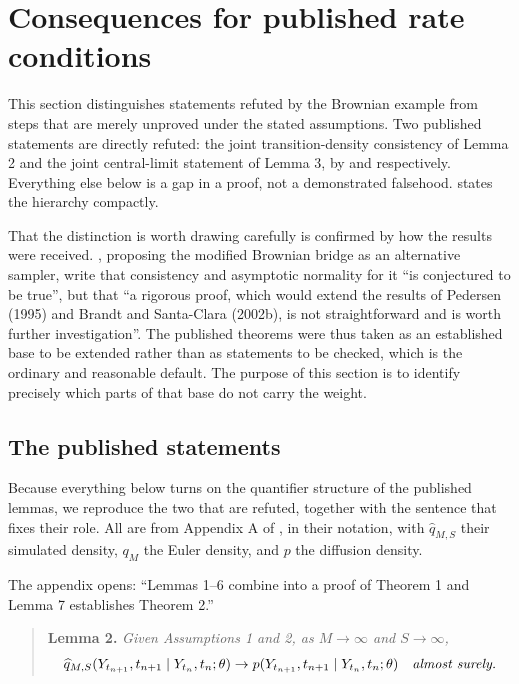 \documentclass[11pt]{article}
\theoremstyle{definition}
\begin{document}
\FloatBarrier
\section{Consequences for published rate conditions}\label{sec:proof_review}

This section distinguishes statements refuted by the Brownian example from steps that are merely unproved under the stated assumptions. Two published statements are directly refuted: the joint transition-density consistency of Lemma 2 and the joint central-limit statement of Lemma 3, by  and  respectively. Everything else below is a gap in a proof, not a demonstrated falsehood.  states the hierarchy compactly.

That the distinction is worth drawing carefully is confirmed by how the results were received. \citet{StramerYan2007b}, proposing the modified Brownian bridge as an alternative sampler, write that consistency and asymptotic normality for it ``is conjectured to be true'', but that ``a rigorous proof, which would extend the results of Pedersen (1995) and Brandt and Santa-Clara (2002b), is not straightforward and is worth further investigation''. The published theorems were thus taken as an established base to be extended rather than as statements to be checked, which is the ordinary and reasonable default. The purpose of this section is to identify precisely which parts of that base do not carry the weight.

\subsection{The published statements}\label{sec:published_statements}

Because everything below turns on the quantifier structure of the published lemmas, we reproduce the two that are refuted, together with the sentence that fixes their role. All are from Appendix A of \citet[pp.~202--203]{BrandtSantaClara2002}, in their notation, with $\widehat q_{M,S}$ their simulated density, $q_M$ the Euler density, and $p$ the diffusion density.

The appendix opens: ``Lemmas 1--6 combine into a proof of Theorem 1 and Lemma 7 establishes Theorem 2.''

\begin{quote}
\textbf{Lemma 2.} \emph{Given Assumptions 1 and 2, as $M\to\infty$ and $S\to\infty$,}
\[
\widehat q_{M,S}(Y_{t_{n+1}},t_{n+1}\mid Y_{t_n},t_n;\theta)\to p(Y_{t_{n+1}},t_{n+1}\mid Y_{t_n},t_n;\theta)
\quad\text{\emph{almost surely.}}
\]
\end{quote}
\end{document}
